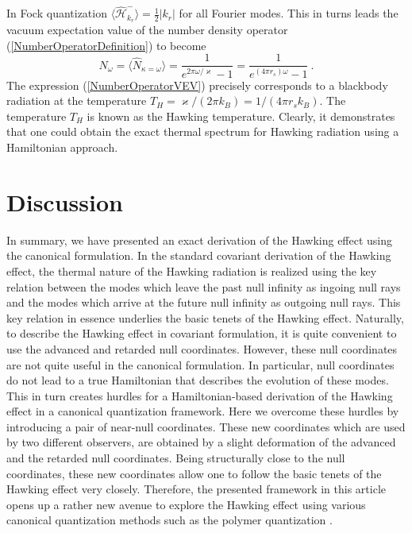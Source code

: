 \documentclass[aps,12pt,showpacs]{revtex4-2}
\def\kr{\kappa}
\def\ksg{\mathrm{\varkappa}}
\def\rs{r_s}
\begin{document}
In Fock quantization $\langle\hat{\mathcal{H}}_{k_r}^{-}\rangle = 
\frac{1}{2}|k_r|$ for all Fourier modes. This in turns leads the vacuum 
expectation value of the number density operator 
(\ref{NumberOperatorDefinition}) to become
%
\begin{equation}\label{NumberOperatorVEV}
N_{\omega} = \langle \hat{N}_{\kr=\omega}\rangle 
= \frac{1}{e^{2\pi\omega/\ksg} - 1} 
= \frac{1}{e^{(4\pi\rs)\omega} - 1} ~.
\end{equation}
% 
The expression (\ref{NumberOperatorVEV}) precisely corresponds to a blackbody 
radiation at the temperature $T_H = \ksg/(2\pi k_B) = 1/(4\pi\rs k_B)$. The 
temperature $T_H$ is known as the Hawking temperature. Clearly, it demonstrates 
that one could obtain the exact thermal spectrum for Hawking radiation using a 
Hamiltonian approach.



\section{Discussion}\label{discussion}


In summary, we have presented an exact derivation of the Hawking effect using 
the canonical formulation. In the standard covariant derivation of the Hawking 
effect, the thermal nature of the Hawking radiation is realized using the key 
relation between the modes which leave the past null infinity as ingoing null 
rays and the modes which arrive at the future null infinity as outgoing null 
rays. This key relation in essence underlies the basic tenets of the Hawking 
effect. Naturally, to describe the Hawking effect in covariant formulation, it 
is quite convenient to  use the advanced and retarded null coordinates. However, 
these null coordinates are not quite useful in the canonical formulation. In 
particular, null coordinates do not lead to a true Hamiltonian that describes 
the evolution of these modes. This in turn creates hurdles for a 
Hamiltonian-based derivation of the Hawking effect in a canonical 
quantization framework. Here we overcome these hurdles by introducing a pair of 
near-null coordinates. These new coordinates which are used by two different 
observers, are obtained by a slight deformation of the advanced and the retarded 
null coordinates.  Being structurally close to the null coordinates, these new 
coordinates allow one to follow the basic tenets of the Hawking effect very 
closely. Therefore, the presented framework in this article opens up a rather 
new avenue to explore the Hawking effect using various canonical quantization 
methods such as the polymer quantization \cite{Barman:2017a2}.
\end{document}
